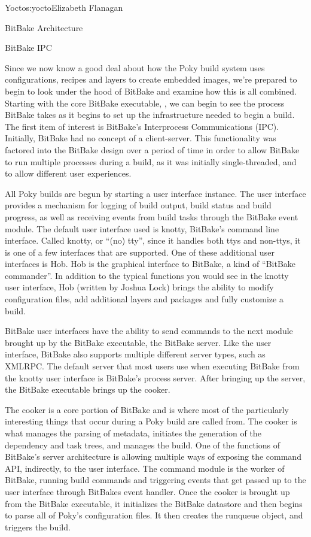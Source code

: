 \begin{aosachapter}{Yocto}{s:yocto}{Elizabeth Flanagan}
\begin{aosasect1}{BitBake Architecture}
\begin{aosasect2}{BitBake IPC}

Since we now know a good deal about how the Poky build system uses
configurations, recipes and layers to create embedded images, we're
prepared to begin to look under the hood of BitBake and examine how
this is all combined. Starting with the core BitBake executable,
, we can begin to see the process BitBake takes as it
begins to set up the infrastructure needed to begin a build. The first
item of interest is BitBake's Interprocess Communications
(IPC). Initially, BitBake had no concept of a
client-server. This functionality was factored into the BitBake design
over a period of time in order to allow BitBake to run multiple
processes during a build, as it was initially single-threaded, and to
allow different user experiences.


All Poky builds are begun by starting a user interface instance. The
user interface provides a mechanism for logging of build output, build
status and build progress, as well as receiving events from build tasks
through the BitBake event module.  The default user interface used is
knotty, BitBake's command line interface. Called knotty, or ``(no)
tty'', since it handles both ttys and non-ttys, it is one of a few
interfaces that are supported.  One of these additional user
interfaces is Hob. Hob is the graphical interface to BitBake, a kind
of ``BitBake commander''. In addition to the typical functions you
would see in the knotty user interface, Hob (written by Joshua Lock)
brings the ability to modify configuration files, add additional
layers and packages and fully customize a build.

BitBake user interfaces have the ability to send commands to the next
module brought up by the BitBake executable, the BitBake server. Like
the user interface, BitBake also supports multiple different server
types, such as XMLRPC. The default server that most users use
when executing BitBake from the knotty user interface is BitBake's
process server. After bringing up the server, the BitBake executable
brings up the cooker.

The cooker is a core portion of BitBake and is where most of the
particularly interesting things that occur during a Poky build are
called from. The cooker is what manages the parsing of metadata,
initiates the generation of the dependency and task trees, and manages
the build. One of the functions of BitBake's server architecture is
allowing multiple ways of exposing the command API, indirectly, to the
user interface. The command module is the worker of BitBake, running
build commands and triggering events that get passed up to the user
interface through BitBakes event handler.  Once the cooker is brought
up from the BitBake executable, it initializes the BitBake datastore
and then begins to parse all of Poky's configuration files. It then
creates the runqueue object, and triggers the build.


\end{aosasect2}
\end{aosasect1}
\end{aosachapter}
